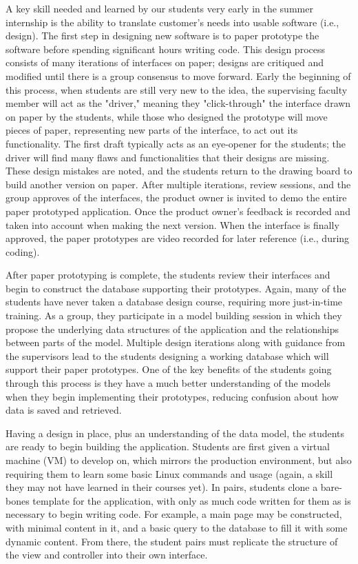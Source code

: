 A key skill needed and learned by our students very early in the summer internship is the ability to translate customer's needs into usable software (i.e., design). The first step in designing new software is to paper prototype \cite{2003paperPrototype} the software before spending significant hours writing code. This design process consists of many iterations of interfaces on paper; designs are critiqued and modified until there is a group consensus to move forward. Early the beginning of this process, when students are still very new to the idea, the supervising faculty member will act as the "driver," meaning they "click-through" the interface drawn on paper by the students, while those who designed the prototype will move pieces of paper, representing new parts of the interface, to act out its functionality. The first draft typically acts as an eye-opener for the students; the driver will find many flaws and functionalities that their designs are missing. These design mistakes are noted, and the students return to the drawing board to build another version on paper. After multiple iterations, review sessions, and the group approves of the interfaces, the product owner is invited to demo the entire paper prototyped application. Once the product owner's feedback is recorded and taken into account when making the next version. When the interface is finally approved, the paper prototypes are video recorded for later reference (i.e., during coding).

After paper prototyping is complete, the students review their interfaces and begin to construct the database supporting their prototypes. Again, many of the students have never taken a database design course, requiring more just-in-time training. As a group, they participate in a model building session in which they propose the underlying data structures of the application and the relationships between parts of the model. Multiple design iterations along with guidance from the supervisors lead to the students designing a working database which will support their paper prototypes. One of the key benefits of the students going through this process is they have a much better understanding of the models when they begin implementing their prototypes, reducing confusion about how data is saved and retrieved.

Having a design in place, plus an understanding of the data model, the students are ready to begin building the application. Students are first given a virtual machine (VM) to develop on, which mirrors the production environment, but also requiring them to learn some basic Linux commands and usage (again, a skill they may not have learned in their courses yet). In pairs, students clone a bare-bones template for the application, with only as much code written for them as is necessary to begin writing code. For example, a main page may be constructed, with minimal content in it, and a basic query to the database to fill it with some dynamic content. From there, the student pairs must replicate the structure of the view and controller into their own interface.

